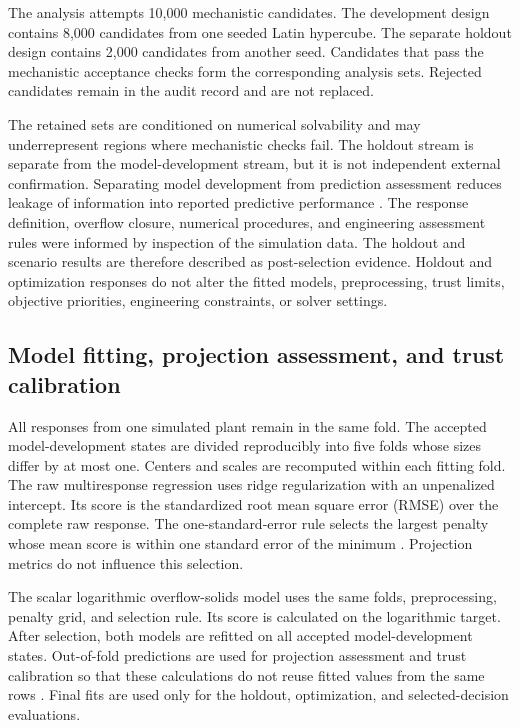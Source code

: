 \documentclass[a4paper,fleqn]{cas-sc}
\begin{document}
The analysis attempts 10,000 mechanistic candidates. The development design contains 8,000 candidates from one seeded Latin hypercube. The separate holdout design contains 2,000 candidates from another seed. Candidates that pass the mechanistic acceptance checks form the corresponding analysis sets. Rejected candidates remain in the audit record and are not replaced.

The retained sets are conditioned on numerical solvability and may underrepresent regions where mechanistic checks fail. The holdout stream is separate from the model-development stream, but it is not independent external confirmation. Separating model development from prediction assessment reduces leakage of information into reported predictive performance \citep{Kaufman2012}. The response definition, overflow closure, numerical procedures, and engineering assessment rules were informed by inspection of the simulation data. The holdout and scenario results are therefore described as post-selection evidence. Holdout and optimization responses do not alter the fitted models, preprocessing, trust limits, objective priorities, engineering constraints, or solver settings.

\subsection{Model fitting, projection assessment, and trust calibration}

All responses from one simulated plant remain in the same fold. The accepted model-development states are divided reproducibly into five folds whose sizes differ by at most one. Centers and scales are recomputed within each fitting fold. The raw multiresponse regression uses ridge regularization with an unpenalized intercept. Its score is the standardized root mean square error (RMSE) over the complete raw response. The one-standard-error rule selects the largest penalty whose mean score is within one standard error of the minimum \citep{Hastie2009}. Projection metrics do not influence this selection.

The scalar logarithmic overflow-solids model uses the same folds, preprocessing, penalty grid, and selection rule. Its score is calculated on the logarithmic target. After selection, both models are refitted on all accepted model-development states. Out-of-fold predictions are used for projection assessment and trust calibration so that these calculations do not reuse fitted values from the same rows \citep{Hastie2009}. Final fits are used only for the holdout, optimization, and selected-decision evaluations.
\end{document}

